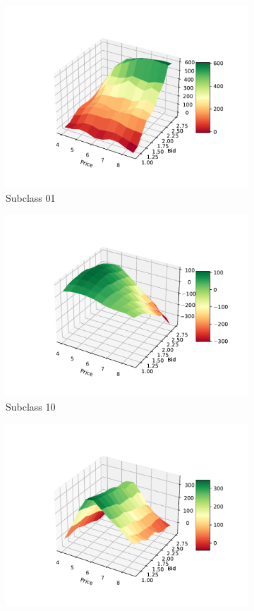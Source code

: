 \documentclass[12pt,a4paper]{report}
\begin{document}
\begin{figure}[H]
\begin{subfigure}{.49\textwidth}
  \includegraphics[width=1\linewidth]{7_01}
  \caption{Subclass 01}
  \label{fig:sub2}
\end{subfigure}
\begin{subfigure}{.49\textwidth}
  \centering
  \includegraphics[width=1\linewidth]{7_10}
  \caption{Subclass 10}
  \label{fig:sub3}
\end{subfigure}
\begin{subfigure}{.49\textwidth}
  \centering
  \includegraphics[width=1\linewidth]{7_11}

\end{subfigure}
\end{figure}
\end{document}
